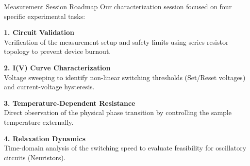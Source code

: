\documentclass[aspectratio=169]{beamer}
\begin{document}
\begin{frame}{Measurement Session Roadmap}
    Our characterization session focused on four specific experimental tasks:
    
    \vspace{0.6cm}
    
    \textbf{1. Circuit Validation} \\
    Verification of the measurement setup and safety limits using series resistor topology to prevent device burnout.

    \vspace{0.4cm}

    \textbf{2. I(V) Curve Characterization} \\
    Voltage sweeping to identify non-linear switching thresholds (Set/Reset voltages) and current-voltage hysteresis.

    \vspace{0.4cm}

    \textbf{3. Temperature-Dependent Resistance} \\
    Direct observation of the physical phase transition by controlling the sample temperature externally.

    \vspace{0.4cm}

    \textbf{4. Relaxation Dynamics} \\
    Time-domain analysis of the switching speed to evaluate feasibility for oscillatory circuits (Neuristors).
\end{frame}
\end{document}
